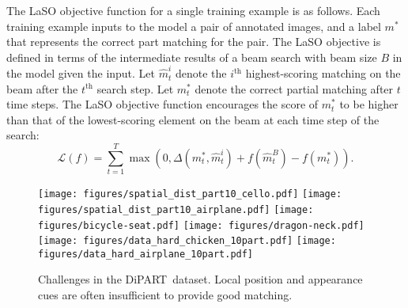 \documentclass[10pt,twocolumn,letterpaper]{article}
\newcommand{\dataset}{\mbox{DiPART}}
\begin{document}
The LaSO objective function for a single training example is as follows. Each training example inputs to the model a pair of annotated images, and a label $m^*$ that represents the correct part matching for the pair. The LaSO objective is defined in terms of the intermediate results of a beam search with beam size $B$ in the model given the input. Let $\hat{m}^i_{t}$ denote the $i^\text{th}$ highest-scoring matching on the beam after the $t^\text{th}$ search step. Let $m^*_{t}$ denote the correct partial matching after $t$ time steps. The LaSO objective function encourages the score of $m^*_{t}$ to be higher than that of the lowest-scoring element on the beam at each time step of the search:
\begin{equation}
\mathcal{L}(f) = \sum_{t=1}^T \max(0, \Delta(m^*_t, \hat{m}^i_t) + f(\hat{m}^B_t) - f(m^*_t)).
\end{equation}\begin{figure*}[ht]
    \centering
    \texttt{[image: figures/spatial\_dist\_part10\_cello.pdf]}
    \texttt{[image: figures/spatial\_dist\_part10\_airplane.pdf]}
    \hspace{.3em}
    \texttt{[image: figures/bicycle-seat.pdf]}
    \texttt{[image: figures/dragon-neck.pdf]}
    \hspace{.3em}
    \texttt{[image: figures/data\_hard\_chicken\_10part.pdf]}
    \texttt{[image: figures/data\_hard\_airplane\_10part.pdf]}
    \vspace{.1em}
    \caption{Challenges in the \dataset\ dataset. Local position and appearance cues are often insufficient to provide good matching.}
    \vspace{-1em}
    \label{fig:difficult_dataset}
\end{figure*}
\end{document}
